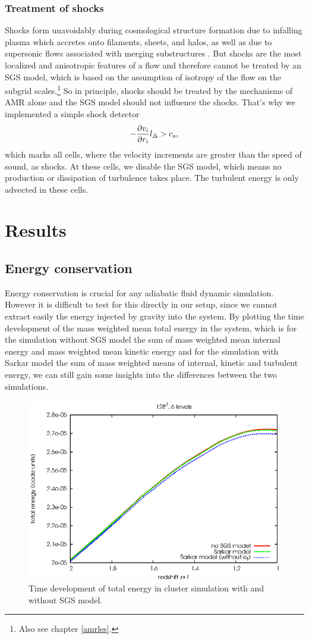 \subsubsection{Treatment of shocks}
Shocks form unavoidably during cosmological structure formation due to
infalling plasma which accretes onto filaments, sheets, and halos, as well as
due to supersonic flows associated with merging substructures
\citep{Pfrommer2006}. But shocks are the most localized and anisotropic
features of a flow and therefore cannot be treated by an SGS model, which 
is based on the assumption of isotropy of the flow on the subgrid
scales.\footnote{Also see chapter \ref{amrles}.} So in principle, shocks should
be treated by the mechanisms of AMR alone and the SGS model should
not influence the shocks. That's why we implemented a simple shock detector
\begin{align}
-\ppd{r_i}{v_i} l_{\Delta} > c_s,
\end{align}
which marks all cells, where the velocity increments are greater than the
speed of sound, as shocks. At these cells, we disable the SGS model, which
means no production or dissipation of turbulence takes place. The turbulent
energy is only advected in these cells.   

\section{Results}
\subsection{Energy conservation}
Energy conservation is crucial for any adiabatic fluid dynamic simulation.
However it is difficult to test for this directly in our setup, since we cannot
extract easily the energy injected by gravity into the system. By plotting the
time development of the mass weighted mean total energy in the system, which is
for the simulation without SGS model the sum of mass weighted mean internal
energy and mass weighted mean kinetic energy and for the simulation with Sarkar
model the sum of mass weighted means of internal, kinetic and turbulent energy,
we can still gain some insights into the differences between the two
simulations. 

\begin{figure}[tp]
\centering
\includegraphics[width=0.7\linewidth]{chapter9/energyerror.eps}
\caption{Time development of total energy in cluster simulation with and
without SGS model.}
\label{fig:etot}
\end{figure}

